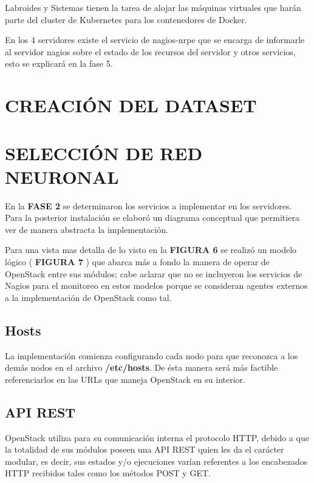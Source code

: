       Labroides y Sistemas tienen la tarea de alojar las máquinas virtuales que harán parte del cluster de Kubernetes para los contenedores de Docker.
      
      En los 4 servidores existe el servicio de nagios-nrpe que se encarga de informarle al servidor nagios sobre el estado de los recursos del servidor y otros servicios, esto se explicará en la fase 5. 
      
    \section{CREACIÓN DEL DATASET} 
      
    \section{SELECCIÓN DE RED NEURONAL}
    
      En la \textbf{FASE 2} se determinaron los servicios a implementar en los servidores. Para la posterior instalación se elaboró un diagrama conceptual que permitiera ver de manera abstracta la implementación. 
    
    
    Para una vista mas detalla de lo visto en la \textbf{FIGURA 6} se realizó un modelo lógico ( \textbf{FIGURA 7} ) que abarca más a fondo la manera de operar de OpenStack entre sus módulos; cabe aclarar que no se incluyeron los servicios de Nagios para el monitoreo en estos modelos porque se consideran agentes externos a la implementación de OpenStack como tal.
    
    
    \subsection{Hosts}
    La implementación comienza configurando cada nodo para que reconozca a los demás nodos en el archivo \textbf{/etc/hosts}. De ésta manera será más factible referenciarlos en las URLs que maneja OpenStack en su interior.
    
    \subsection{API REST}
    OpenStack utiliza para su comunicación interna el protocolo HTTP, debido a que la totalidad de sus módulos poseen una API REST quien les da el carácter modular, es decir, sus estados y/o ejecuciones varían referentes a los encabezados HTTP recibidos tales como los métodos POST y GET.
     
